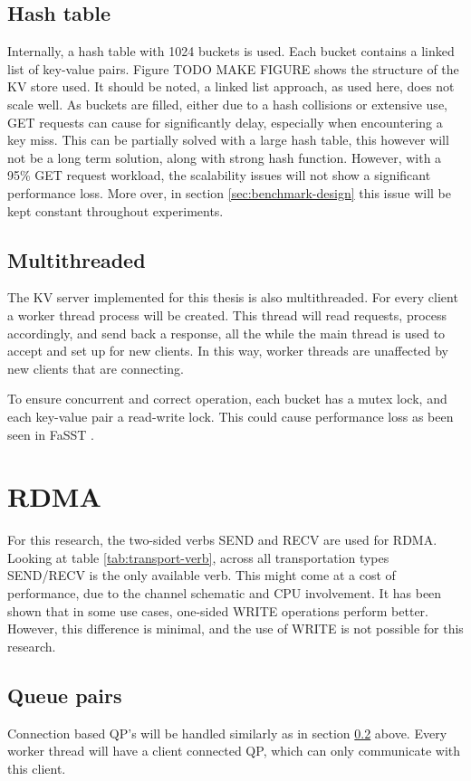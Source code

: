 \subsection{Hash table}
Internally, a hash table with 1024 buckets is used.
Each bucket contains a linked list of key-value pairs.
Figure TODO MAKE FIGURE shows the structure of the KV store used.
It should be noted, a linked list approach, as used here, does not scale well.
As buckets are filled, either due to a hash collisions or extensive use, GET requests can cause for significantly delay, especially when encountering a key miss.
This can be partially solved with a large hash table, this however will not be a long term solution, along with strong hash function.
However, with a 95\% GET request workload, the scalability issues will not show a significant performance loss.
More over, in section \ref{sec:benchmark-design} this issue will be kept constant throughout experiments.

\subsection{Multithreaded}\label{subsec:multithreaded}
The KV server implemented for this thesis is also multithreaded.
For every client a worker thread process will be created.
This thread will read requests, process accordingly, and send back a response, all the while the main thread is used to accept and set up for new clients.
In this way, worker threads are unaffected by new clients that are connecting.

To ensure concurrent and correct operation, each bucket has a mutex lock, and each key-value pair a read-write lock.
This could cause performance loss as been seen in FaSST \cite{kalia2016fasst, qiu2018toward}.

\section{RDMA}\label{sec:rdma2}
For this research, the two-sided verbs SEND and RECV are used for RDMA.
Looking at table \ref{tab:transport-verb}, across all transportation types SEND/RECV is the only available verb.
This might come at a cost of performance, due to the channel schematic and CPU involvement.
It has been shown that in some use cases, one-sided WRITE operations perform better\cite{kalia2014using}.
However, this difference is minimal, and the use of WRITE is not possible for this research.

\subsection{Queue pairs}
Connection based QP's will be handled similarly as in section \ref{subsec:multithreaded} above.
Every worker thread will have a client connected QP, which can only communicate with this client.

